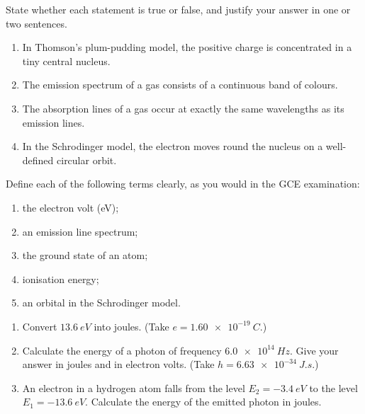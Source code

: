 \documentclass[11pt]{article}
\newcommand{\cle}[1]{{\popxbold\color{popdark}#1}}
\newcounter{popsec}
\newcounter{popsub}
\newcommand{\courssub}[1]{%
  \stepcounter{popsub}%
  \par\vspace{9pt}\noindent{\popxbold\fontsize{11.5}{13}\selectfont\color{popink}{\color{poporange}\thepopsec.\thepopsub}\hspace{6pt}#1}\par\nopagebreak\vspace{4pt}
}
\begin{document}
\begin{exercice}
State whether each statement is true or false, and justify your answer in one or two sentences.
\begin{enumerate}
\item In Thomson's plum-pudding model, the positive charge is concentrated in a tiny central nucleus.
\item The emission spectrum of a gas consists of a continuous band of colours.
\item The absorption lines of a gas occur at exactly the same wavelengths as its emission lines.
\item In the Schrodinger model, the electron moves round the nucleus on a well-defined circular orbit.
\end{enumerate}
\end{exercice}

\begin{exercice}
Define each of the following terms clearly, as you would in the GCE examination:
\begin{enumerate}
\item the \cle{electron volt} (eV);
\item an \cle{emission line spectrum};
\item the \cle{ground state} of an atom;
\item \cle{ionisation energy};
\item an \cle{orbital} in the Schrodinger model.
\end{enumerate}
\end{exercice}

\begin{exercice}
\begin{enumerate}
\item Convert $\SI{13.6}{eV}$ into joules. (Take $e = \SI{1.60e-19}{C}$.)
\item Calculate the energy of a photon of frequency $\SI{6.0e14}{Hz}$. Give your answer in joules and in electron volts. (Take $h = \SI{6.63e-34}{J.s}$.)
\item An electron in a hydrogen atom falls from the level $E_2 = \SI{-3.4}{eV}$ to the level $E_1 = \SI{-13.6}{eV}$. Calculate the energy of the emitted photon in joules.
\end{enumerate}
\end{exercice}

\courssub{I practise}
\end{document}

